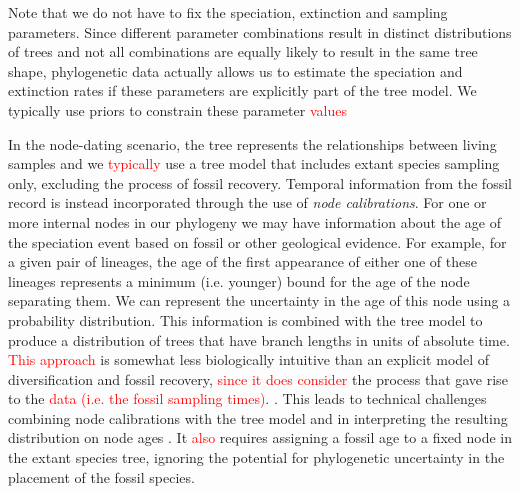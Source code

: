 \documentclass[11pt]{article}
\newcommand{\edit}[1]{{\textcolor{red}{#1}}} %
\begin{document}
Note that we do not have to fix the speciation, extinction and sampling parameters. 
Since different parameter combinations result in distinct distributions of trees and not all combinations are equally likely to result in the same tree shape, phylogenetic data actually allows us to estimate the speciation and extinction rates if these parameters are explicitly part of the tree model. 
We typically use priors to constrain these parameter \edit{values} 

In the node-dating scenario, the tree represents the relationships between living samples and we  \edit{typically} use a tree model that includes extant species sampling only, excluding the process of fossil recovery.
Temporal information from the fossil record is instead incorporated through the use of \textit{node calibrations}. 
For one or more internal nodes in our phylogeny we may have information about the age of the speciation event based on fossil or other geological evidence.
For example, for a given pair of lineages, the age of the first appearance of either one of these lineages represents a minimum (i.e. younger) bound for the age of the node separating them.
We can represent the uncertainty in the age of this node using a probability distribution. %
This information is combined with the tree model to produce a distribution of trees that have branch lengths in units of absolute time.
 \edit{This approach} is somewhat less biologically intuitive than an explicit model of diversification and fossil recovery, \edit{since it does consider}
 the process  that gave rise to the \edit{data (i.e. the fossil sampling times)}. .
This leads to technical challenges combining node calibrations with the tree model and in interpreting the resulting distribution on node ages \cite{Heled2012,Warnock2015}.
 It \edit{also} requires assigning a fossil age to a fixed node in the extant species tree, ignoring the potential for phylogenetic uncertainty in the placement of the fossil species.
\end{document}
